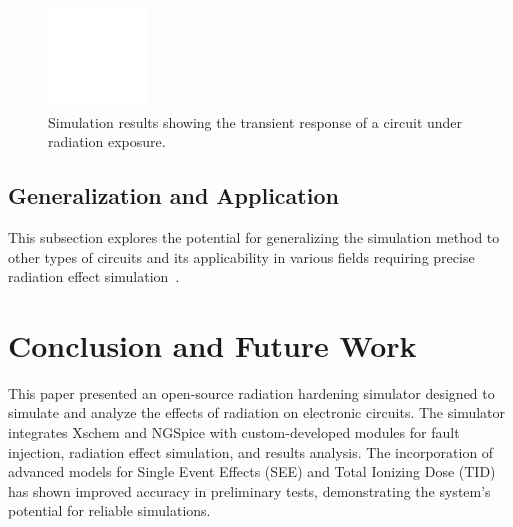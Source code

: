 \documentclass[conference]{IEEEtran}
\begin{document}
    \begin{figure}[htbp]
        \centering
        \includegraphics[width=0.8\linewidth]{simulation_results_placeholder}
        \caption{Simulation results showing the transient response of a circuit under radiation exposure.}
        \label{fig:simulation_results}
    \end{figure}

    \subsection{Generalization and Application}\label{subsec:generalization-and-application}
    This subsection explores the potential for generalizing the simulation method to other types of circuits and its applicability in various fields requiring precise radiation effect simulation~\cite{Pepper1990}.


    \section{Conclusion and Future Work}\label{sec:conclusion-and-future-work}
    This paper presented an open-source radiation hardening simulator designed to simulate and analyze the effects of radiation on electronic circuits.
    The simulator integrates Xschem and NGSpice with custom-developed modules for fault injection, radiation effect simulation, and results analysis.
    The incorporation of advanced models for Single Event Effects (SEE) and Total Ionizing Dose (TID) has shown improved accuracy in preliminary tests, demonstrating the system's potential for reliable simulations.
\end{document}
